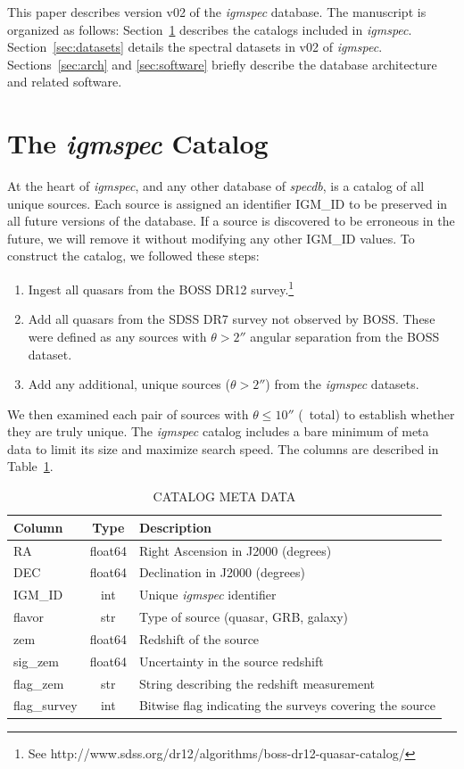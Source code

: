 \documentclass[12pt]{elsarticle}
\begin{document}
This paper describes version v02 of the {\it igmspec}
database.  The manuscript is organized as follows:
Section~\ref{sec:catalog} describes the catalogs
included in {\it igmspec}.
Section~\ref{sec:datasets} details the spectral datasets
in v02 of {\it igmspec}.
Sections~\ref{sec:arch} and \ref{sec:software}
briefly describe the database architecture and
related software.



\section{The {\it igmspec} Catalog}
\label{sec:catalog}

At the heart of {\it igmspec}, and any other database  
of {\it specdb}, is a catalog of all unique sources.
Each source is assigned an identifier IGM\_ID to be
preserved in all future versions of the database.
If a source is discovered to be erroneous in the future, 
we will remove it without modifying
any other IGM\_ID values.
To construct the catalog, we followed these steps:

\begin{enumerate}
\item Ingest all quasars from the BOSS DR12 survey.\footnote{See
http://www.sdss.org/dr12/algorithms/boss-dr12-quasar-catalog/}
\item Add all quasars from the SDSS DR7 survey not observed by BOSS.
These were defined as any sources with $\theta > 2''$ angular separation
from the BOSS dataset.
\item Add any additional, unique sources ($\theta > 2''$)
from the {\it igmspec} datasets.
\end{enumerate}
We then examined each pair of sources with $\theta \le 10''$ 
(\npair\ total) to establish whether they are truly unique.
The {\it igmspec} catalog includes a bare minimum of meta data
to limit its size and maximize search speed.
The columns are described in Table~\ref{tab:cat_keys}.

 
\begin{table}
\caption{CATALOG META DATA\label{tab:cat_keys}}
\footnotesize
\begin{tabular}{lcl}
Column & Type  & Description \\
\hline
RA           & float64 & Right Ascension in J2000 (degrees) \\
DEC          & float64 & Declination in J2000 (degrees) \\
IGM\_ID      & int     & Unique {\it igmspec} identifier \\
flavor       & str     & Type of source (quasar, GRB, galaxy) \\
zem          & float64 & Redshift of the source \\
sig\_zem     & float64 & Uncertainty in the source redshift \\
flag\_zem    & str     & String describing the redshift measurement \\
flag\_survey & int     & Bitwise flag indicating the surveys covering the source \\
\hline
\end{tabular}
\end{table}
\end{document}
